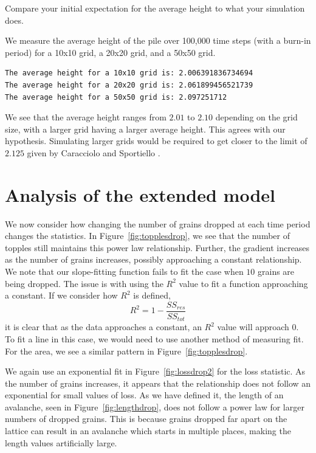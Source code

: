 \begin{question}
    Compare your initial expectation for the average height to what your simulation does. 
\end{question}


We measure the average height of the pile over 100,000 time steps (with a burn-in period) for a 10x10 grid, a 20x20 grid, and a 50x50 grid.

\begin{verbatim}
The average height for a 10x10 grid is: 2.006391836734694
The average height for a 20x20 grid is: 2.061899456521739
The average height for a 50x50 grid is: 2.097251712
\end{verbatim}

We see that the average height ranges from $2.01$ to $2.10$ depending on the grid size, with a larger grid having a larger average height. This agrees with our hypothesis. Simulating larger grids would be required to get closer to the limit of $2.125$ given by Caracciolo and Sportiello \cite{Car12}.


\section{Analysis of the extended model}

We now consider how changing the number of grains dropped at each time period changes the statistics. In Figure~\ref{fig:topplesdrop}, we see that the number of topples still maintains this power law relationship. Further, the gradient increases as the number of grains increases, possibly approaching a constant relationship. We note that our slope-fitting function fails to fit the case when $10$ grains are being dropped. The issue is with using the $R^2$ value to fit a function approaching a constant. If we consider how $R^2$ is defined, 
\[R^2=1-\frac{SS_{res}}{SS_{tot}}\]
it is clear that as the data approaches a constant, an $R^2$ value will approach 0. To fit a line in this case, we would need to use another method of measuring fit. For the area, we see a similar pattern in Figure~\ref{fig:topplesdrop}. 

We again use an exponential fit in Figure~\ref{fig:lossdrop2} for the loss statistic. As the number of grains increases, it appears that the relationship does not follow an exponential for small values of loss. As we have defined it, the length of an avalanche, seen in Figure~\ref{fig:lengthdrop}, does not follow a power law for larger numbers of dropped grains. This is because grains dropped far apart on the lattice can result in an avalanche which starts in multiple places, making the length values artificially large.



